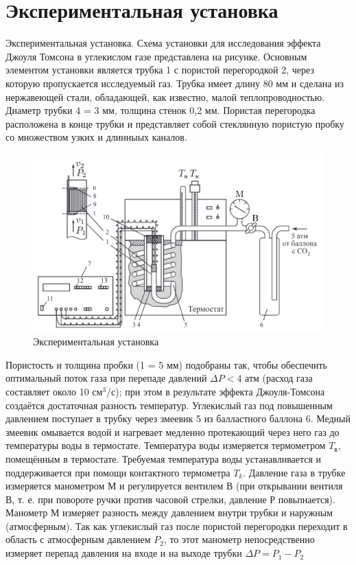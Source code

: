 \documentclass[a4paper, 10pt, twocolumn]{article}
\begin{document}
\section{Экспериментальная установка}
    Экспериментальная установка. Схема установки для исследования эффекта Джоуля Томсона в углекислом 
    газе представлена на рисунке. Основным элементом установки является трубка 1 с пористой 
    перегородкой 2, через которую пропускается исследуемый газ. Трубка имеет длину 80 мм и сделана из нержавеющей стали, обладающей, как известно, малой теплопроводностью. Диаметр трубки 4 = 3 мм, толщина стенок 0,2 мм. Пористая перегородка расположена в конце трубки и
    представляет собой стеклянную пористую пробку со множеством узких и длинныых каналов.
    \begin{figure}[H]
        \includegraphics[width=1\linewidth]{images/installation.png}
        \begin{center}
            \caption{Экспериментальная установка}
        \end{center}
    \end{figure}
    Пористость и толщина пробки (1 = 5 мм) подобраны так, чтобы обеспечить оптимальный поток газа 
    при перепаде давлений $\Delta P < 4$ атм (расход газа составляет около 10 $\text{см}^3/\text{с}
    $); при этом в
    результате эффекта Джоуля-Томсона создаётся достаточная разность температур. Углекислый газ под 
    повышенным давлением поступает в трубку через змеевик 5 из балластного баллона 6. Медный 
    змеевик омывается водой и нагревает медленно протекающий через него газ до температуры 
    воды в термостате. Температура воды измеряется термометром $T_\text{в}$, помещённым в 
    термостате. Требуемая температура воды устанавливается и поддерживается при помощи контактного 
    термометра $T_k$. Давление газа в трубке измеряется манометром М и регулируется вентилем В (при 
    открывании вентиля В, т. е. при повороте ручки против часовой стрелки, давление Р повьпнается). 
    Манометр М измеряет разность между давлением внутри трубки и наружным (атмосферным).
    Так как углекислый газ после пористой перегородки переходит в область с атмосферным давлением 
    $ P_2 $, то этот манометр непосредственно измеряет перепад давления на входе и на выходе трубки
    $\Delta P = P_1 - P_2$ 
\end{document}
